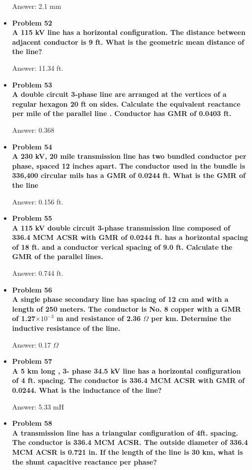 \documentclass{article}
\begin{document}
\begin{center}
\begin{itemize}
    Answer: 2.1 mm

    \item\textbf{Problem 52\\%
    A 115 kV line has a horizontal configuration. The distance between adjacent conductor is 9 ft. What is the geometric mean distance of the line?}

    Answer: 11.34 ft.

    \item\textbf{Problem 53\\%
    A double circuit 3-phase line are arranged at the vertices of a regular hexagon 20 ft on sides. Calculate the equivalent reactance per mile of the parallel line . Conductor has GMR of 0.0403 ft.}

    Answer: 0.368

    \item\textbf{Problem 54\\%
    A 230 kV, 20 mile transmission line has two bundled conductor per phase, spaced 12 inches apart. The conductor used in the bundle is 336,400 circular mils has a GMR of 0.0244 ft. What is the GMR of the line}

    Answer: 0.156 ft.

    \item\textbf{Problem 55\\%
    A 115 kV double circuit 3-phase transmission line composed of 336.4 MCM ACSR with GMR of 0.0244 ft. has a horizontal spacing of 18 ft. and a conductor verical spacing of 9.0 ft. Calculate the GMR of the parallel lines.}

    Answer: 0.744 ft. 

    \item\textbf{Problem 56\\%
    A single phase secondary line has spacing of 12 cm and with a length of 250 meters. The conductor is No. 8 copper with a GMR of 1.27$\times10^{-3}$ m and resistance of 2.36 $\Omega$ per km. Determine the inductive resistance of the line.}

    Answer: 0.17 $\Omega$

    \item\textbf{Problem 57\\%
    A 5 km long , 3- phase 34.5 kV line has a horizontal configuration of 4 ft. spacing. The conductor is 336.4 MCM ACSR with GMR of 0.0244. What is the inductance of the line?}

    Answer: 5.33 mH

    \item\textbf{Problem 58\\%
    A transmission line has a triangular configuration of 4ft. spacing. The conductor is 336.4 MCM ACSR. The outside diameter of 336.4 MCM ACSR is 0.721 in. If the length of the line is 30 km, what is the shunt capacitive reactance per phase?}


\end{itemize}
\end{center}
\end{document}
